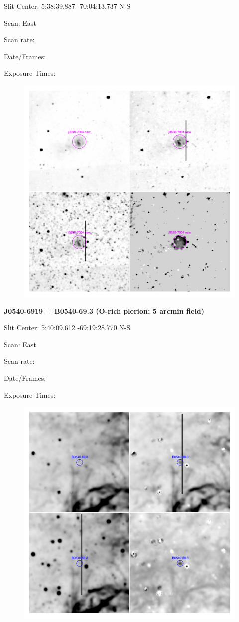 \documentclass[11pt]{article}
\begin{document}
Slit Center:  5:38:39.887  -70:04:13.737 N-S

Scan:  East

Scan rate:  

Date/Frames:

Exposure Times:  

\begin{figure}
\includegraphics[width=11.cm]{snapshots/J0538-7004.png}
\end{figure}

\newpage
{\bf J0540-6919 = B0540-69.3  (O-rich plerion; 5 arcmin field)}  
 
Slit Center:  5:40:09.612  -69:19:28.770 N-S

Scan:  East

Scan rate:  

Date/Frames:

Exposure Times:  

\begin{figure}
\includegraphics[width=11.cm]{snapshots/B0540-693_5arcmin.png}
\end{figure}
\end{document}
